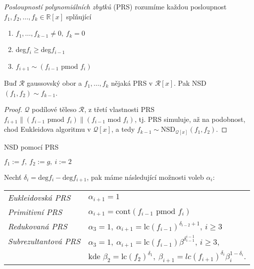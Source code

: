 \begin{defn}
    \textit{Posloupností polynomiálních zbytků} (PRS) rozumíme každou posloupnost $f_1,f_2,\dots,f_k\in \mathbb{R}[x]$ splňující
    \begin{enumerate}
        \item $f_1,\dots,f_{k-1} \neq 0,\ f_k=0$
        \item deg$f_i\geq$deg$f_{i-1}$
        \item $f_{i+1} \sim (f_{i-1} \text{ pmod } f_i)$
    \end{enumerate}
\end{defn}

\begin{claim}
    Buď $\mathcal{R}$ gaussovský obor a $f_1,\dots,f_k$ nějaká PRS v $\mathcal{R}[x]$. Pak NSD$(f_1,f_2)\sim f_{k-1}$.
    \begin{proof}
        $\mathcal{Q}$ podílové těleso $\mathcal{R}$, z třetí vlastnosti PRS $f_{i+1}\parallel(f_{i-1} \text{ pmod } f_i) \parallel(f_{i-1} \text{ mod } f_i)$, tj. PRS simuluje, až na podobnost, chod Eukleidova algoritmu v $\mathcal{Q}[x]$, a tedy $f_{k-1}\sim\text{NSD}_{\mathcal{Q}[x]}(f_1,f_2)$.
    \end{proof}
\end{claim}

\begin{algorithm}
    \caption{NSD pomocí PRS}
    $f_1:=f,\ f_2:=g,\ i:=2$\;
    \vspace{0.2cm}
\end{algorithm}

Nechť $\delta_i=\text{deg}f_i-\text{deg}f_{i+1}$, pak máme následující možnosti voleb $\alpha_i$:

\begin{tabular}{lp{9cm}}
    \textit{Eukleidovská PRS}    & $\alpha_{i+1}=1$\\
    \textit{Primitivní PRS}     & $\alpha_{i+1}=\text{cont}(f_{i-1} \text{ pmod } f_i)$\\
    \textit{Redukovaná PRS}     & $\alpha_3=1,\ \alpha_{i+1} = \text{lc}(f_{i-1})^{\delta_{i-2}+1},\, i\geq3$\\
    \textit{Subrezultantová PRS}& $\alpha_3=1,\ \alpha_{i+1} = \text{lc}(f_{i-1})\beta^{\delta_{i-1}^{i-1}},\, i\geq3,$\\
    & kde $\beta_2=\text{lc}(f_2)^{\delta_1},\ \beta_{i+1}=lc(f_{i+1})^{\delta_i}\beta_i^{1-\delta_i}$.
\end{tabular}

